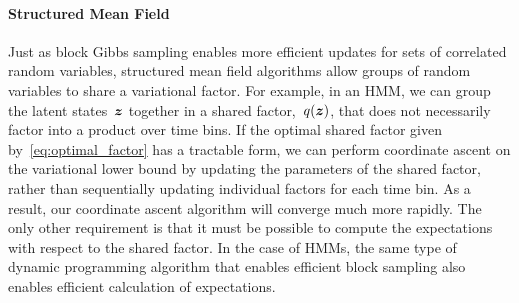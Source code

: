 \paragraph{Structured Mean Field}
Just as block Gibbs sampling enables more efficient updates for sets
of correlated random variables, structured mean field algorithms allow
groups of random variables to share a variational factor.  For
example, in an HMM, we can group the latent states~$\boldsymbol{z}$ together in a
shared factor,~$q(\boldsymbol{z})$, that does not necessarily factor into a
product over time bins.
If the optimal shared factor given by~\eqref{eq:optimal_factor} has
a tractable form, we can perform coordinate ascent on the variational
lower bound by updating the parameters of the shared factor,
rather than sequentially updating individual factors for each time bin.
As a result, our coordinate ascent algorithm will converge much more rapidly.
The only other requirement is that it must be possible to compute the
expectations with respect to the shared factor. In the case of HMMs,
the same type of dynamic programming algorithm that enables efficient
block sampling also enables efficient calculation of expectations. 

